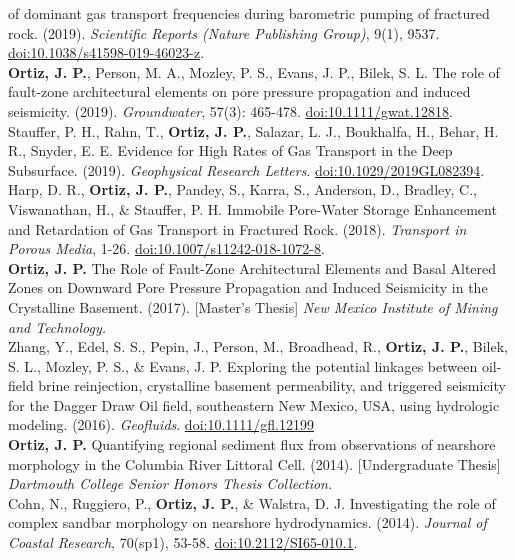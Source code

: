 \documentclass[11pt, letterpaper]{article}
\newcommand{\years}[1]{\marginnote{\scriptsize #1}}
\begin{document}
of dominant gas transport frequencies during barometric pumping of fractured
rock. (2019). \emph{Scientific Reports (Nature Publishing Group)}, 9(1), 9537.
\href{https://www.nature.com/articles/s41598-019-46023-z.pdf}{doi:10.1038/s41598-019-46023-z}.
\ScientificReportsOOOOIdentificationofdomi\\ 
%
\years{2019}\textbf{Ortiz, J. P.}, Person,
M. A., Mozley, P. S., Evans, J. P., Bilek, S. L. The role of fault-zone
architectural elements on pore pressure propagation and induced seismicity.
(2019). \emph{Groundwater}, 57(3): 465-478. 
\href{https://ngwa.onlinelibrary.wiley.com/doi/epdf/10.1111/gwat.12818}{doi:10.1111/gwat.12818}.
\GroundwaterOOOOTheRoleofFaultZoneAr\\
%
\years{2019}Stauffer, P. H., Rahn, T., \textbf{Ortiz, J. P.}, Salazar, L. J.,
Boukhalfa, H., Behar, H. R., Snyder, E. E. Evidence for High Rates of Gas
Transport in the Deep Subsurface. (2019). \emph{Geophysical Research Letters}.
\href{https://agupubs.onlinelibrary.wiley.com/doi/epdf/10.1029/2019GL082394}{doi:10.1029/2019GL082394}.
\GeophysicalResearchLOOOOEvidenceforHighRates\\ 
%
\years{2018}Harp, D. R., \textbf{Ortiz, J. P.},
Pandey, S., Karra, S., Anderson, D., Bradley, C., Viswanathan, H., \& Stauffer,
P. H. Immobile Pore-Water Storage Enhancement and Retardation of Gas Transport
in Fractured Rock. (2018). \emph{Transport in Porous Media}, 1-26.
\href{https://link.springer.com/content/pdf/10.1007/s11242-018-1072-8.pdf}{doi:10.1007/s11242-018-1072-8}.
\TransportinPorousMedOOOOImmobileporewatersto\\ 
%
\years{2017}\textbf{Ortiz, J. P.} The Role of Fault-Zone Architectural Elements
and Basal Altered Zones on Downward Pore Pressure Propagation and Induced
Seismicity in the Crystalline Basement. (2017). [Master's Thesis] \emph{New
Mexico Institute of Mining and Technology.}
\NewMexicoInstituteofOOOOTheRoleofFaultZoneAr\\ 
%
\years{2016}Zhang, Y., Edel, S. S., Pepin, J., Person, M., Broadhead, R.,
\textbf{Ortiz, J. P.}, Bilek, S. L., Mozley, P. S., \& Evans, J.  P. Exploring
the potential linkages between oil-field brine reinjection, crystalline
basement permeability, and triggered seismicity for the Dagger Draw Oil field,
southeastern New Mexico, USA, using hydrologic modeling. (2016). \emph{Geofluids}.
\href{https://onlinelibrary.wiley.com/doi/epdf/10.1111/gfl.12199}{doi:10.1111/gfl.12199}
\GeofluidsOOOOExploringthepotentia\\
%
\years{2014}\textbf{Ortiz, J. P.} Quantifying regional sediment flux from
observations of nearshore morphology in the Columbia River Littoral Cell.
(2014). [Undergraduate Thesis] \emph{Dartmouth College Senior Honors Thesis
Collection.}\\ 
%
\years{2014}Cohn, N., Ruggiero, P., \textbf{Ortiz, J. P.}, \& Walstra, D. J.
Investigating the role of complex sandbar morphology on nearshore
hydrodynamics. (2014). \emph{Journal of Coastal Research}, 70(sp1), 53-58.
\href{https://bioone.org/journalArticle/Download?urlId=10.2112%2FSI65-010.1}{doi:10.2112/SI65-010.1}.
\JournalofCoastalReseOOOOInvestigatingtherole
\end{document}
